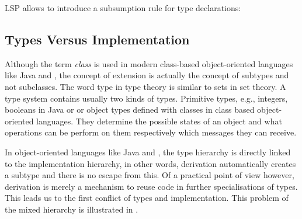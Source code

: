 LSP allows to introduce a subsumption rule for type declarations:

\begin{defn}[Subsumption]
\label{def:subsumption}
	\begin{mathpar}
	\end{mathpar}
\end{defn}

\subsection{Types Versus Implementation}
\label{sec:sharingTypes}

Although the term \emph{class} is used in modern class-based
object-oriented languages like Java and \cpp, the concept of extension
is actually the concept of subtypes and not subclasses. The word type
in type theory is similar to sets in set theory. A type system contains
usually two kinds of types. Primitive types, e.g., integers, booleans
in Java or \cpp or object types defined with classes in class based
object-oriented languages. They determine the possible states of an
object and what operations can be perform on them respectively which
messages they can receive.

In object-oriented languages like Java and \cpp, the type hierarchy
is directly linked to the implementation hierarchy, in other words,
derivation automatically creates a subtype and there is no escape from
this. Of a practical point of view however, derivation is merely a
mechanism to reuse code in further specialisations of types. This leads
us to the first conflict of types and implementation. This problem of
the mixed hierarchy is illustrated in 
\cite{simons_theory_2003-4}.

